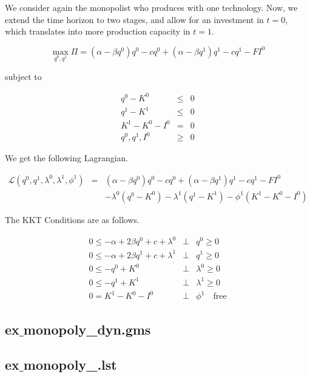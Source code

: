 \documentclass[11pt,a4paper]{article}
\begin{document}
We consider again the monopolist who produces with one technology. Now, we extend the time horizon to two stages, and allow for an investment in $t=0$, which translates into more production capacity in $t=1$.

\begin{equation*}
	\max_{q^0,q^1}\Pi = (\alpha-\beta q^0)q^0 - cq^0 +  (\alpha-\beta q^1)q^1 - cq^1 -FI^0
\end{equation*}

subject to

\begin{eqnarray*}
	q^0 - K^0 &\leq& 0\\
	q^1 - K^1 &\leq& 0\\
        K^1 - K^0 - I^0 &=& 0\\
	q^0,q^1,I^0 &\geq& 0 
\end{eqnarray*}
 
We get the following Lagrangian.

\begin{eqnarray*}
	\mathcal{L}(q^0,q^1,\lambda^0,\lambda^1,\phi^1)&=& (\alpha-\beta q^0)q^0 - cq^0 +  (\alpha-\beta q^1)q^1 - cq^1 -FI^0 \\
        && - \lambda^0(q^0-K^0) - \lambda^1(q^1-K^1) - \phi^1(K^1-K^0-I^0)
\end{eqnarray*}

The KKT Conditions are as follows.

\begin{eqnarray*}
	0 \leq -\alpha + 2\beta q^0 + c + \lambda^0 &\bot& q^0 \geq 0\\
        0 \leq -\alpha + 2\beta q^1 + c + \lambda^1 &\bot& q^1 \geq 0\\
	0 \leq -q^0 + K^0 &\bot& \lambda^0 \geq 0 \\
        0 \leq -q^1 + K^1 &\bot& \lambda^1 \geq 0 \\
        0 = K^1 - K^0 - I^0 &\bot& \phi^1 \quad \mbox{free}
\end{eqnarray*}


\subsection*{ex$\_$monopoly\_dyn.gms}



\subsection*{ex$\_$monopoly\_.lst}
\end{document}
